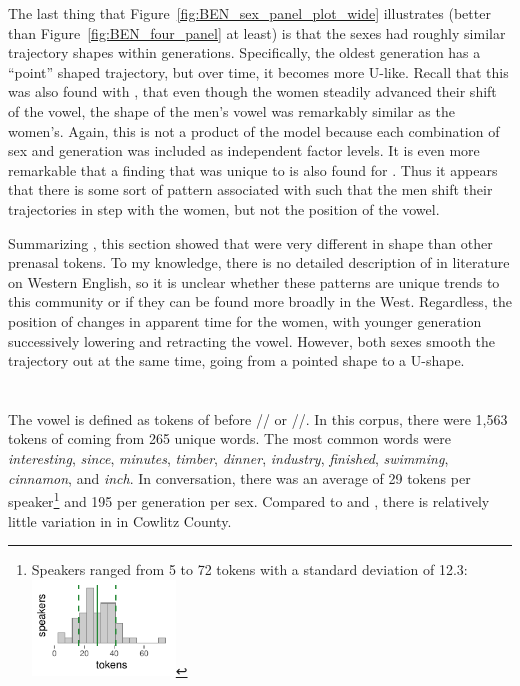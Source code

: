 The last thing that Figure~\ref{fig:BEN_sex_panel_plot_wide} illustrates (better than Figure~\ref{fig:BEN_four_panel} at least) is that the sexes had roughly similar trajectory shapes within generations. Specifically, the oldest generation has a ``point'' shaped trajectory, but over time, it becomes more U-like. Recall that this was also found with \bet, that even though the women steadily advanced their shift of the vowel, the shape of the men's vowel was remarkably similar as the women's. Again, this is not a product of the model because each combination of sex and generation was included as independent factor levels. It is even more remarkable that a finding that was unique to \bet is also found for \ben. Thus it appears that there is some sort of pattern associated with \dress such that the men shift their trajectories in step with the women, but not the position of the vowel.

Summarizing \ben, this section showed that \ben were very different in shape than other prenasal tokens. To my knowledge, there is no detailed description of \ben in literature on Western English, so it is unclear whether these patterns are unique trends to this community or if they can be found more broadly in the West. Regardless, the position of \ben changes in apparent time for the women, with younger generation successively lowering and retracting the vowel. However, both sexes smooth the trajectory out at the same time, going from a pointed shape to a U-shape.



\section{\bin}
\label{BIN}

The \bin vowel is defined as tokens of \bit before // or //. In this corpus, there were 1,563 tokens of \bin coming from 265 unique words. The most common words were \textit{interesting}, \textit{since}, \textit{minutes}, \textit{timber}, \textit{dinner}, \textit{industry}, \textit{finished}, \textit{swimming}, \textit{cinnamon}, and \textit{inch}. In conversation, there was an average of 29 tokens per speaker\footnote{Speakers ranged from 5 to 72 tokens with a standard deviation of 12.3: \includegraphics[width = 1.5in]{Figures/BIN/BIN_tiny.pdf}} and 195 per generation per sex. Compared to \ban and \ben, there is relatively little variation in \bin in Cowlitz County.

